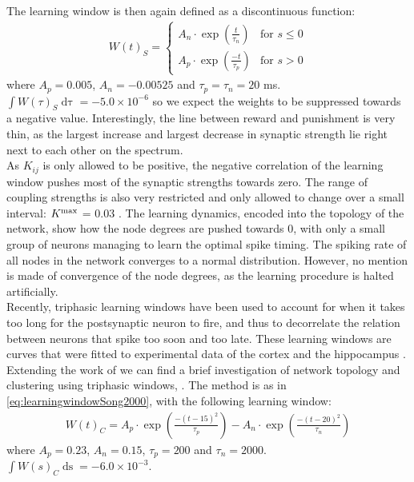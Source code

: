 The learning window is then again defined as a discontinuous function:
\begin{align}
W(t)_S =
\begin{cases}
A_{n} \cdot \exp \left(\frac{t}{\tau_n}\right)  & \text{for } s \leq 0 \\
A_{p} \cdot \exp \left(\frac{-t}{\tau_p}\right) & \text{for } s > 0 
\end{cases} \label{eq:learningwindowSong2000}
\end{align}
where $A_p = 0.005$, $A_n = -0.00525$ and $\tau_p = \tau_n = 20$ ms. $\int W(\tau)_S \mathop{d \tau} = -5.0 \times 10^{-6}$ so we expect the weights to be suppressed towards a negative value. Interestingly, the line between reward and punishment is very thin, as the largest increase and largest decrease in synaptic strength lie right next to each other on the spectrum. \\

As $K_{ij}$ is only allowed to be positive, the negative correlation of the learning window pushes most of the synaptic strengths towards zero. The range of coupling strengths is also very restricted and only allowed to change over a small interval: $K^{\rm max}$ = 0.03 \cite{Song2000, Song2017, ChrolCannon2012}. The learning dynamics, encoded into the topology of the network, show how the node degrees are pushed towards 0, with only a small group of neurons managing to learn the optimal spike timing. The spiking rate of all nodes in the network converges to a normal distribution. However, no mention is made of convergence of the node degrees, as the learning procedure is halted artificially.\\

Recently, triphasic learning windows have been used to account for when it takes too long for the postsynaptic neuron to fire, and thus to decorrelate the relation between neurons that spike too soon and too late. These learning windows are curves that were fitted to experimental data of the cortex and the hippocampus \cite{ChrolCannon2014}. 
Extending the work of \cite{Song2000} we can find a brief investigation of network topology and clustering using triphasic windows, \cite{ChrolCannon2012}. The method is as in \eqref{eq:learningwindowSong2000}, with the following learning window:
\begin{align}
W(t)_C = A_{p} \cdot \exp \left(\frac{-\left(t - 15 \right)^{2}}{ \tau_{p}}\right) - A_{n} \cdot \exp \left(\frac{-\left(t - 20\right)^{2}}{ \tau_{n}}\right)  \label{eq:learningwindowChrolCannon2012}
\end{align}
where $A_{p}=0.23$, $A_{n}=0.15$, $\tau_{p}=200$ and $\tau_n = 2000$. $\int W(s)_C \mathop{d s} = -6.0 \times 10^{-3}$. \\

